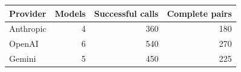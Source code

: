 \begin{tabular}{lrrr}
\toprule
Provider & Models & Successful calls & Complete pairs \\
\midrule
Anthropic & 4 & 360 & 180 \\
OpenAI & 6 & 540 & 270 \\
Gemini & 5 & 450 & 225 \\
\bottomrule
\end{tabular}
